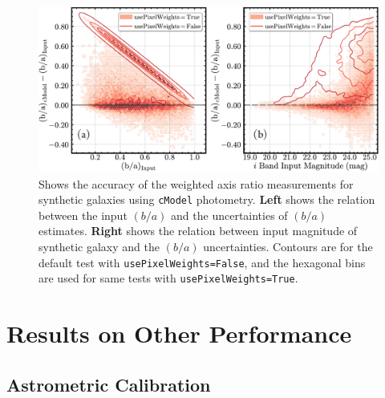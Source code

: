 \documentclass[useamsfonts]{pasj01}
\def\cmodel{\texttt{cModel}}
\begin{document}
\begin{figure}
    \begin{center}
        \includegraphics[width=\textwidth]{fig/synpipe_galaxy_ba}
    \end{center}
    \caption{
        Shows the accuracy of the weighted axis ratio measurements for synthetic 
        galaxies using \cmodel{} photometry. 
        \textbf{Left} shows the relation between the input $(b/a)$ and the 
        uncertainties of $(b/a)$ estimates. 
        \textbf{Right} shows the relation between input magnitude of synthetic galaxy
        and the $(b/a)$ uncertainties. 
        Contours are for the default test with \texttt{usePixelWeights=False}, and the 
        hexagonal bins are used for same tests with \texttt{usePixelWeights=True}.
        }
    \label{fig:galaxy_ba}
\end{figure}



\section{Results on Other Performance}
    \label{sec:others}
 
\subsection{Astrometric Calibration} 
    \label{ssec:astrometry}
\end{document}
